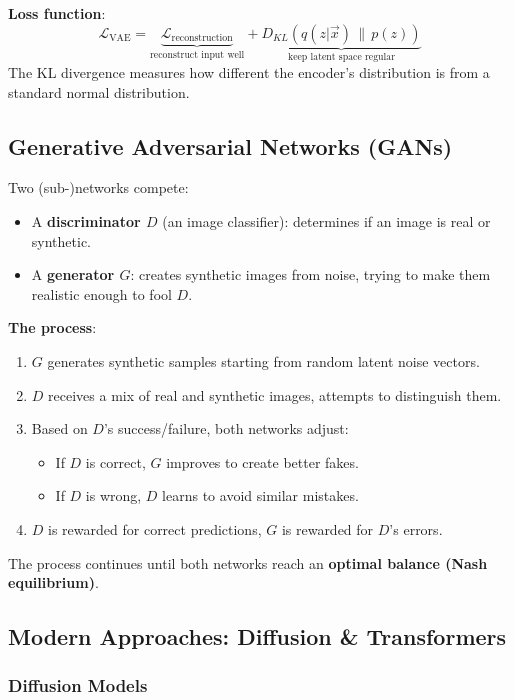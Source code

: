 \documentclass[11pt,a4paper]{article}
\newcommand{\vx}{\vec{x}}
\begin{document}
\textbf{Loss function}:
\[
\mathcal{L}_{\text{VAE}} = \underbrace{\mathcal{L}_{\text{reconstruction}}}_{\text{reconstruct input well}} + \underbrace{D_{KL}(q(z|\vx)\,\|\,p(z))}_{\text{keep latent space regular}}
\]
The KL divergence measures how different the encoder's distribution is from a standard normal distribution.

\subsection{Generative Adversarial Networks (GANs)}

Two (sub-)networks compete:
\begin{itemize}[leftmargin=*]
    \item A \textbf{discriminator $D$} (an image classifier): determines if an image is real or synthetic.
    \item A \textbf{generator $G$}: creates synthetic images from noise, trying to make them realistic enough to fool $D$.
\end{itemize}

\textbf{The process}:
\begin{enumerate}[leftmargin=*]
    \item $G$ generates synthetic samples starting from random latent noise vectors.
    \item $D$ receives a mix of real and synthetic images, attempts to distinguish them.
    \item Based on $D$'s success/failure, both networks adjust:
    \begin{itemize}
        \item If $D$ is correct, $G$ improves to create better fakes.
        \item If $D$ is wrong, $D$ learns to avoid similar mistakes.
    \end{itemize}
    \item $D$ is rewarded for correct predictions, $G$ is rewarded for $D$'s errors.
\end{enumerate}

The process continues until both networks reach an \textbf{optimal balance (Nash equilibrium)}.

\subsection{Modern Approaches: Diffusion \& Transformers}

\subsubsection{Diffusion Models}
\end{document}

